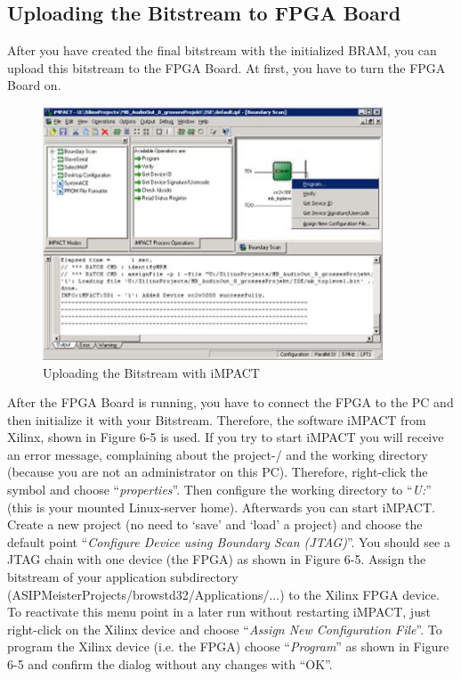 \hypertarget{uploading-the-bitstream-to-fpga-board}{%
\subsection{Uploading the Bitstream to FPGA
Board}\label{uploading-the-bitstream-to-fpga-board}}

After you have created the final bitstream with the initialized BRAM,
you can upload this bitstream to the FPGA Board. At first, you have to
turn the FPGA Board on.
\begin{figure}[!htb]
	\centering
	\includegraphics[width=0.9\textwidth]{src/images/6-5.png}
	\caption{Uploading the Bitstream with iMPACT}
	\label{fig:fig65}
\end{figure}
After the FPGA Board is running, you have to connect the FPGA to the PC
and then initialize it with your Bitstream. Therefore, the software
iMPACT from Xilinx, shown in Figure 6-5 is used. If you try to start
iMPACT you will receive an error message, complaining about the
project-/ and the working directory (because you are not an
administrator on this PC). Therefore, right-click the symbol and choose
``\emph{properties}''. Then configure the working directory to
``\emph{U:}'' (this is your mounted Linux-server home). Afterwards you
can start iMPACT. Create a new project (no need to `save' and `load' a
project) and choose the default point ``\emph{Configure Device using
Boundary Scan (JTAG)}''. You should see a JTAG chain with one device
(the FPGA) as shown in Figure 6-5. Assign the bitstream of your
application subdirectory
(ASIPMeisterProjects/browstd32/Applications/...) to the Xilinx FPGA
device. To reactivate this menu point in a later run without restarting
iMPACT, just right-click on the Xilinx device and choose ``\emph{Assign
New Configuration File}''. To program the Xilinx device (i.e. the FPGA)
choose ``\emph{Program}'' as shown in Figure 6-5 and confirm the dialog
without any changes with ``OK''.

